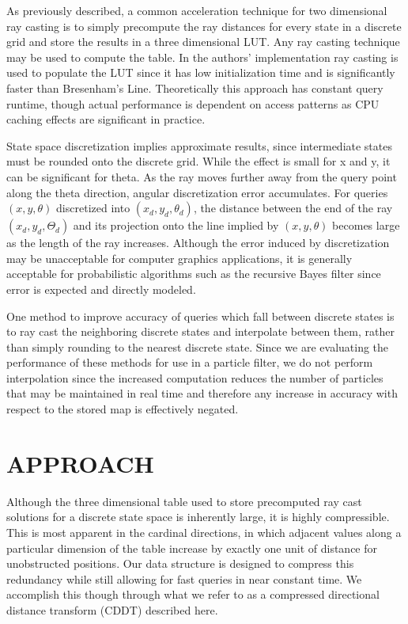 \documentclass[letterpaper, 10 pt, conference]{ieeeconf}  %
\begin{document}
As previously described, a common acceleration technique for two dimensional ray casting is to simply precompute the ray distances for every state in a discrete grid and store the results in a three dimensional LUT. Any ray casting technique may be used to compute the table. In the authors’ implementation ray casting is used to populate the LUT since it has low initialization time and is significantly faster than Bresenham’s Line. Theoretically this approach has constant query runtime, though actual performance is dependent on access patterns as CPU caching effects are significant in practice.

State space discretization implies approximate results, since intermediate states must be rounded onto the discrete grid. While the effect is small for x and y, it can be significant for theta. As the ray moves further away from the query point along the theta direction, angular discretization error accumulates. For queries $(x,y,\theta)$ discretized into $(x_d,y_d,\theta_d)$, the distance between the end of the ray $(x_d,y_d,Θ_d)$ and its projection onto the line implied by $(x,y,\theta)$ becomes large as the length of the ray increases. Although the error induced by discretization may be unacceptable for computer graphics applications, it is generally acceptable for probabilistic algorithms such as the recursive Bayes filter since error is expected and directly modeled. 

One method to improve accuracy of queries which fall between discrete states is to ray cast the neighboring discrete states and interpolate between them, rather than simply rounding to the nearest discrete state. Since we are evaluating the performance of these methods for use in a particle filter, we do not perform interpolation since the increased computation reduces the number of particles that may be maintained in real time and therefore any increase in accuracy with respect to the stored map is effectively negated.

\section{APPROACH}

Although the three dimensional table used to store precomputed ray cast solutions for a discrete state space is inherently large, it is highly compressible. This is most apparent in the cardinal directions, in which adjacent values along a particular dimension of the table increase by exactly one unit of distance for unobstructed positions. Our data structure is designed to compress this redundancy while still allowing for fast queries in near constant time. We accomplish this though through what we refer to as a compressed directional distance transform (CDDT) described here.
\end{document}
